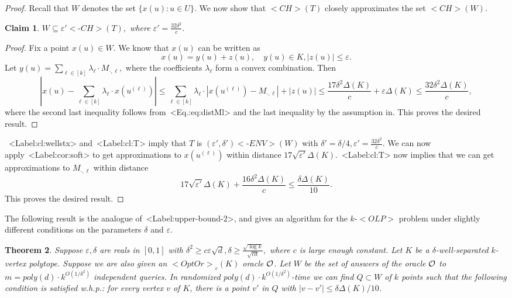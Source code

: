 \documentclass[11pt,letterpaper]{article}
\newcounter{note}[section]
\def\mathsf#1{<#1>}%
\def\xspace{}%
\def\Cref#1{<Label:#1>}%
\def\eqref#1{<Eq.:#1>}%
\newtheorem{theorem}{Theorem}[section]
\newtheorem{claim}[theorem]{Claim}
\theoremstyle{definition}
\theoremstyle{remark}
\newcommand{\CH}{{\mathsf {CH}}}
\newcommand{\edenvp}{{(\varepsilon', \delta'){{\mathsf{\mbox{-}ENV}}}}}
\newcommand{\echp}{{\varepsilon'{{\mathsf{\mbox{-}CH}}}}}
\newcommand{\uell}{{u^{(\ell)}}}
\newcommand{\olp}{{\mathsf {OLP}}\xspace}
\newcommand{\kolp}{k\mbox{-}\olp}
\newcommand{\Mdot}[1]{{M_{\cdot, #1}}}
\newcommand{\opto}{{\mathsf{OptOr}}}
\begin{document}
\begin{proof}
Recall that $W$ denotes the set $\{x(u): u \in U\}$. We now show that $\CH(T)$ closely approximates the set $\CH(W)$. 
\begin{claim}
    \label{cl:T}
    $W \subseteq \echp(T), $ where $\varepsilon'= \frac{32 \delta^2}{c}. $
\end{claim}

\begin{proof}
    Fix a point $x(u) \in W$. We know that $x(u)$ can be written as 
    $$ x(u) = y(u) + z(u), \quad y(u) \in K, |z(u)| \leq \varepsilon.$$
    Let $y(u) = \sum_{\ell \in [k]} \lambda_{\ell} \cdot \Mdot{\ell}, $ where the coefficients $\lambda_\ell$ form a convex combination. Then 
    $$ \left|x(u) - \sum_{\ell \in [k]} \lambda_\ell \cdot x(\uell) \right| \leq \sum_{\ell \in [k]} \lambda_\ell \cdot |x(\uell) - \Mdot{\ell}| + |z(u)| \leq \frac{17 \delta^2 \Delta(K)}{c} + \varepsilon \Delta(K) \leq \frac{32 \delta^2 \Delta(K)}{c},  $$
    where the second last inequality follows from~\eqref{eq:distMl} and the last inequality by the assumption in. This proves the desired result. 
\end{proof}


~\Cref{cl:wellstx} and~\Cref{cl:T} imply that $T$ is $\edenvp(W)$ with $\delta' = \delta/4, \varepsilon'= \frac{32 \delta^2}{c}$. We can now apply~\Cref{cor:soft} to get approximations to $x(\uell)$ within distance $17 \sqrt{\varepsilon'} \Delta(K)$.~\Cref{cl:T} now implies that we can get approximations to $\Mdot{\ell}$ within distance 
$$ 17 \sqrt{\varepsilon'} \Delta(K) + \frac{16 \delta^2 \Delta(K)}{c} \leq \frac{\delta \Delta(K)}{10}.$$
This proves the desired result.
\end{proof}

The following result is the analogue of~\Cref{upper-bound-2}, and gives an algorithm for the $\kolp$ problem under slightly different conditions on the parameters $\delta$ and $\varepsilon$. 

\begin{theorem}\label{upper-bound-2kolp}
Suppose $\varepsilon,\delta$ are reals in $[0,1]$ with $\delta^2\geq c\varepsilon\sqrt d, \delta \geq \frac{ \sqrt{\log k}}{\sqrt{cd}},$ where $c$ is  large enough constant.  Let $K$ be a $\delta$-well-separated $k$-vertex polytope. Suppose we are also given an $\opto_\varepsilon(K)$ oracle $\cal O$.
Let $W$ be the set of answers of the oracle $\cal O$ to $m=poly(d)\cdot k^{O(1/\delta^2)}$ independent queries.  In randomized $poly(d) \cdot k^{O(1/\delta^2)}$-time we can find $Q\subset W$ of $k$ points such that the following condition is satisfied w.h.p.:  for every vertex $v$ of $K$, there is a point $v'$ in $Q$ with $|v-v'| \leq \delta \Delta(K)/10$. 
\end{theorem}
\end{document}
